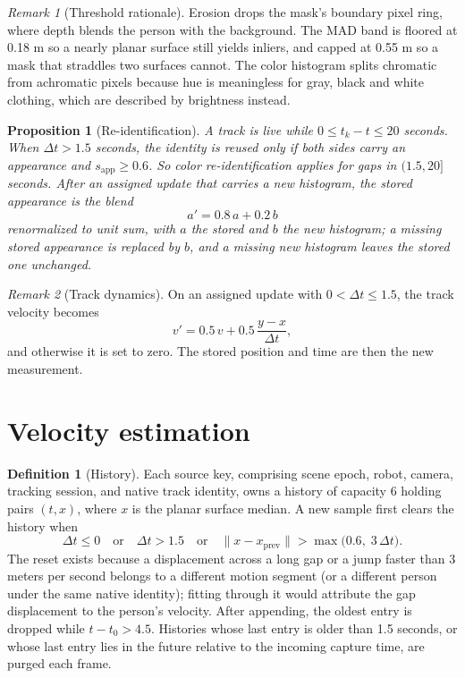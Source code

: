 \documentclass[10pt,a4paper]{article}
\theoremstyle{plain}
\newtheorem{proposition}{Proposition}[section]
\theoremstyle{definition}
\newtheorem{definition}{Definition}[section]
\theoremstyle{remark}
\newtheorem{remark}{Remark}[section]
\begin{document}
\begin{remark}[Threshold rationale]\label{rem:thresholds}
Erosion drops the mask's boundary pixel ring, where depth blends the person with the background. The MAD band is floored at 0.18 m so a nearly planar surface still yields inliers, and capped at 0.55 m so a mask that straddles two surfaces cannot. The color histogram splits chromatic from achromatic pixels because hue is meaningless for gray, black and white clothing, which are described by brightness instead.
\end{remark}

\begin{proposition}[Re-identification]\label{prop:reid}
A track is live while $0 \le t_k - t \le 20$ seconds. When $\Delta t > 1.5$ seconds, the identity is reused only if both sides carry an appearance and $s_{\mathrm{app}} \ge 0.6$. So color re-identification applies for gaps in $(1.5, 20]$ seconds. After an assigned update that carries a new histogram, the stored appearance is the blend
\begin{equation}
a' = 0.8\,a + 0.2\,b
\end{equation}
renormalized to unit sum, with $a$ the stored and $b$ the new histogram; a missing stored appearance is replaced by $b$, and a missing new histogram leaves the stored one unchanged.
\end{proposition}

\begin{remark}[Track dynamics]\label{rem:trackdyn}
On an assigned update with $0 < \Delta t \le 1.5$, the track velocity becomes
\begin{equation}
v' = 0.5\,v + 0.5\,\frac{y - x}{\Delta t},
\end{equation}
and otherwise it is set to zero. The stored position and time are then the new measurement.
\end{remark}

\section{Velocity estimation}

\begin{definition}[History]\label{def:history}
Each source key, comprising scene epoch, robot, camera, tracking session, and native track identity, owns a history of capacity 6 holding pairs $(t, x)$, where $x$ is the planar surface median. A new sample first clears the history when
\begin{equation}
\Delta t \le 0 \quad\text{or}\quad \Delta t > 1.5 \quad\text{or}\quad \|x - x_{\mathrm{prev}}\| > \max\bigl(0.6,\; 3\,\Delta t\bigr).
\end{equation}
The reset exists because a displacement across a long gap or a jump faster than 3 meters per second belongs to a different motion segment (or a different person under the same native identity); fitting through it would attribute the gap displacement to the person's velocity. After appending, the oldest entry is dropped while $t - t_0 > 4.5$. Histories whose last entry is older than 1.5 seconds, or whose last entry lies in the future relative to the incoming capture time, are purged each frame.
\end{definition}
\end{document}
